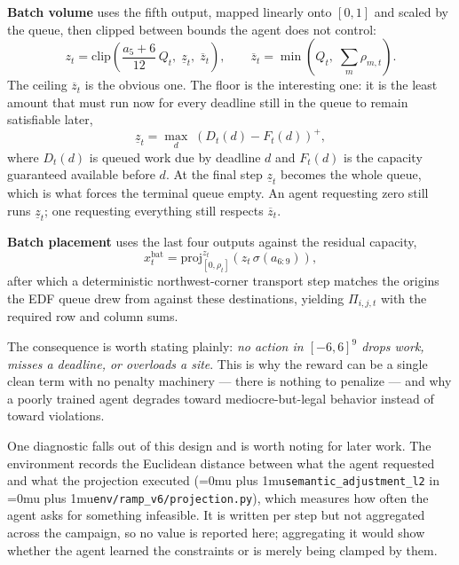 ﻿\documentclass[12pt]{article}
\newcommand{\codepath}[1]{{\Urlmuskip=0mu plus 1mu\relax\nolinkurl{#1}}}
\begin{document}
\textbf{Batch volume} uses the fifth output, mapped linearly onto \([0,1]\) and
scaled by the queue, then clipped between bounds the agent does not control:
\begin{equation}
  z_t=\mathrm{clip}\!\left(\frac{a_5+6}{12}\,Q_t,\;\underline{z}_t,\;\overline{z}_t\right),
  \qquad
  \overline{z}_t=\min\!\left(Q_t,\;\textstyle\sum_m \rho_{m,t}\right).
  \label{eq:decoder-batch-volume}
\end{equation}
The ceiling \(\overline{z}_t\) is the obvious one. The floor is the interesting
one: it is the least amount that must run now for every deadline still in the
queue to remain satisfiable later,
\begin{equation}
  \underline{z}_t=\max_{d}\;\left(D_t(d)-F_t(d)\right)^{+},
  \label{eq:decoder-floor}
\end{equation}
where \(D_t(d)\) is queued work due by deadline \(d\) and \(F_t(d)\) is the
capacity guaranteed available before \(d\). At the final step \(\underline{z}_t\)
becomes the whole queue, which is what forces the terminal queue empty. An agent
requesting zero still runs \(\underline{z}_t\); one requesting everything still
respects \(\overline{z}_t\).

\textbf{Batch placement} uses the last four outputs against the residual
capacity,
\begin{equation}
  x^{\mathrm{bat}}_t=\mathrm{proj}_{[0,\rho_t]}^{z_t}\!\left(z_t\,\sigma(a_{6:9})\right),
  \label{eq:decoder-batch-placement}
\end{equation}
after which a deterministic northwest-corner transport step matches the origins
the EDF queue drew from against these destinations, yielding \(\Pi_{i,j,t}\)
with the required row and column sums.

The consequence is worth stating plainly: \emph{no action in \([-6,6]^9\) drops
work, misses a deadline, or overloads a site}. This is why the reward can be a
single clean term with no penalty machinery --- there is nothing to penalize ---
and why a poorly trained agent degrades toward mediocre-but-legal behavior
instead of toward violations.

One diagnostic falls out of this design and is worth noting for later work. The
environment records the Euclidean distance between what the agent requested and
what the projection executed (\codepath{semantic_adjustment_l2} in
\codepath{env/ramp_v6/projection.py}), which measures how often the agent asks
for something infeasible. It is written per step but not aggregated across the
campaign, so no value is reported here; aggregating it would show whether the
agent learned the constraints or is merely being clamped by them.
\end{document}
